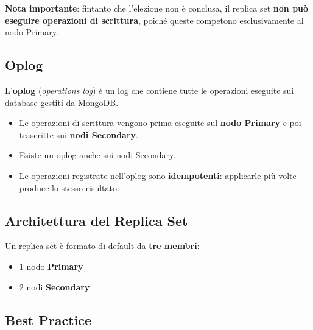\textbf{Nota importante}: fintanto che l'elezione non è conclusa, il replica set \textbf{non può eseguire operazioni di scrittura}, poiché queste competono esclusivamente al nodo Primary.

\subsection*{Oplog}

L'\textbf{oplog} (\textit{operations log}) è un log che contiene tutte le operazioni eseguite sui database gestiti da MongoDB.

\begin{itemize}
	\item Le operazioni di scrittura vengono prima eseguite sul \textbf{nodo Primary} e poi trascritte sui \textbf{nodi Secondary}.
	\item Esiste un oplog anche sui nodi Secondary.
	\item Le operazioni registrate nell'oplog sono \textbf{idempotenti}: applicarle più volte produce lo stesso risultato.
\end{itemize}

\subsection{Architettura del Replica Set}

Un replica set è formato di default da \textbf{tre membri}:
\begin{itemize}
	\item 1 nodo \textbf{Primary}
	\item 2 nodi \textbf{Secondary}
\end{itemize}

\subsection*{Best Practice}

